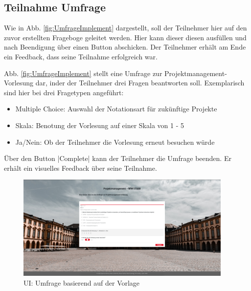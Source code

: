 
\subsection{Teilnahme Umfrage}
\label{ssec:UmfrageImplement}

Wie in Abb. \vref{fig:UmfrageImplement} dargestellt, soll der Teilnehmer hier auf den zuvor erstellten Frageboge geleitet werden. 
Hier kann dieser diesen ausfüllen und nach Beendigung über einen Button abschicken. 
Der Teilnehmer erhält am Ende ein Feedback, dass seine Teilnahme erfolgreich war.

Abb. \vref{fig:UmfrageImplement}  stellt eine Umfrage zur Projektmanagement-Vorlesung dar, inder der Teilnehmer drei Fragen beantworten soll. 
Exemplarisch sind hier bei drei Fragetypen angeführt: 
\begin{itemize}
	\item Multiple Choice: Auswahl der Notationsart für zukünftige Projekte
	\item Skala: Benotung der Vorlesung auf einer Skala von 1 - 5
	\item Ja/Nein: Ob der Teilnehmer die Vorlesung erneut besuchen würde 
\end{itemize}

Über den Button \jinline|Complete| kann der Teilnehmer die Umfrage beenden. 
Er erhält ein visuelles Feedback über seine Teilnahme.

\begin{figure}[hp]
	\centering
	\includegraphics[width=0.95\textwidth, keepaspectratio]{img/client/TeilnahmeUmfrage.png}
	\captionsetup{justification=centering, format=plain}
	\caption[\acf{UI}: Umfrage basierend auf der Vorlage]{\acf{UI}: Umfrage basierend auf der Vorlage \\ \quelleScreenshot}
	\label{fig:UmfrageImplement}
\end{figure}
